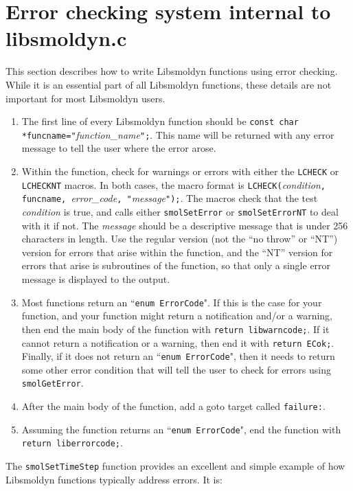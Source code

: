 \documentclass {book}
\begin{document}
\section{Error checking system internal to libsmoldyn.c}

This section describes how to write Libsmoldyn functions using error checking. While it is an essential part of all Libsmoldyn functions, these details are not important for most Libsmoldyn users.

\begin{enumerate}
\item The first line of every Libsmoldyn function should be \texttt{const char *funcname="}\emph{function\_name}\texttt{";}. This name will be returned with any error message to tell the user where the error arose.
\item Within the function, check for warnings or errors with either the \texttt{LCHECK} or \texttt{LCHECKNT} macros. In both cases, the macro format is \texttt{LCHECK(}\emph{condition}\texttt{, funcname, }\emph{error\_code}\texttt{, "}\emph{message}\texttt{");}. The macros check that the test \emph{condition} is true, and calls either \texttt{smolSetError} or \texttt{smolSetErrorNT} to deal with it if not. The \emph{message} should be a descriptive message that is under 256 characters in length. Use the regular version (not the ``no throw'' or ``NT'') version for errors that arise within the function, and the ``NT'' version for errors that arise is subroutines of the function, so that only a single error message is displayed to the output.
\item Most functions return an ``\texttt{enum ErrorCode}". If this is the case for your function, and your function might return a notification and/or a warning, then end the main body of the function with \texttt{return libwarncode;}. If it cannot return a notification or a warning, then end it with \texttt{return ECok;}. Finally, if it does not return an ``\texttt{enum ErrorCode}", then it needs to return some other error condition that will tell the user to check for errors using \texttt{smolGetError}.
\item After the main body of the function, add a goto target called \texttt{failure:}.
\item Assuming the function returns an ``\texttt{enum ErrorCode}", end the function with \texttt{return liberrorcode;}.
\end{enumerate}

The \texttt{smolSetTimeStep} function provides an excellent and simple example of how Libsmoldyn functions typically address errors. It is:
\end{document}
